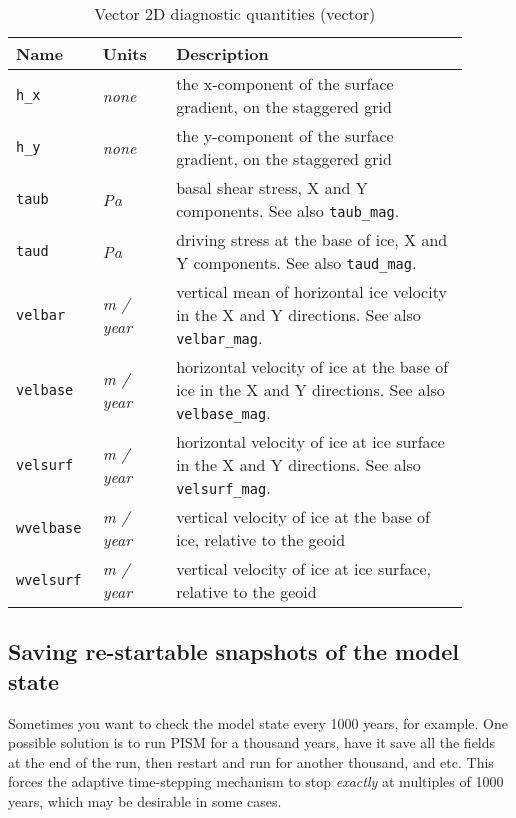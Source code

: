 \begin{table}[ht]
  \centering
  \begin{tabular}{p{0.15\linewidth}p{0.15\linewidth}p{0.6\linewidth}}
    \toprule
    \textbf{Name} & \textbf{Units} & \textbf{Description} \\
    \midrule
    \texttt{h_x} & \textsl{none} &  the x-component of the surface gradient, on the staggered grid\\
    \texttt{h_y} & \textsl{none} &  the y-component of the surface gradient, on the staggered grid\\
    \texttt{taub} & \textsl{Pa} & basal shear stress, X and Y components. See also \texttt{taub_mag}. \\
    \texttt{taud} & \textsl{Pa} & driving stress at the base of ice, X and Y components. See also \texttt{taud_mag}. \\
    \texttt{velbar} & \textsl{m / year} &  vertical mean of horizontal ice velocity in the X and Y directions. See also \texttt{velbar_mag}. \\
    \texttt{velbase} & \textsl{m / year} &  horizontal velocity of ice at the base of ice in the X and Y directions. See also \texttt{velbase_mag}. \\
    \texttt{velsurf} & \textsl{m / year} &  horizontal velocity of ice at ice surface in the X and Y directions. See also \texttt{velsurf_mag}.\\
    \texttt{wvelbase} & \textsl{m / year} &  vertical velocity of ice at the base of ice, relative to the geoid \\
    \texttt{wvelsurf} & \textsl{m / year} &  vertical velocity of ice at ice surface, relative to the geoid \\
    \bottomrule
  \end{tabular}
  \caption{Vector 2D diagnostic quantities (vector)}
  \label{tab:two-d-diagnostics-vector}
\end{table}

\clearpage

\subsection{Saving re-startable snapshots of the model state}
\label{sec:snapshots}
Sometimes you want to check the model state every 1000 years, for example.  One possible solution is to run PISM for a thousand years, have it save all the fields at the end of the run, then restart and run for another thousand, and etc.  This forces the adaptive time-stepping mechanism to stop \emph{exactly} at multiples of 1000 years, which may be desirable in some cases.

